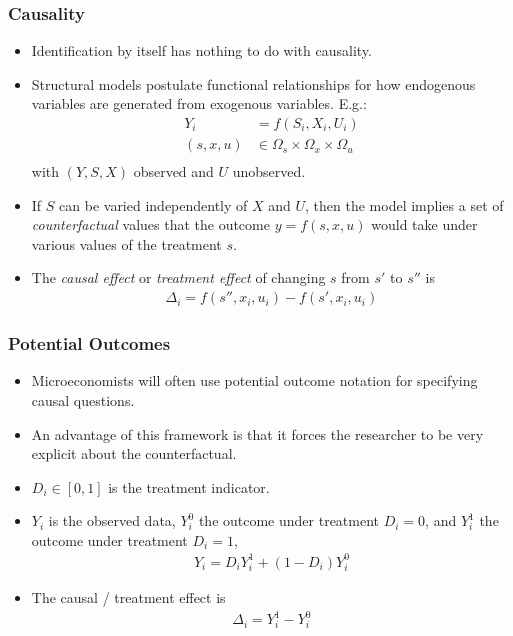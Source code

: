 \documentclass[english,xcolor=svgnames]{beamer}
\begin{document}
\begin{frame}
\frametitle[alignment=center]{Causality}
\begin{itemize}
	\item Identification by itself has nothing to do with causality. 
	\item Structural models postulate functional relationships for how endogenous variables are generated from exogenous variables. E.g.:
	\begin{align*}
		Y_i &= f(S_i,X_i,U_i) \\
		(s,x,u) &\in \Omega_s \times \Omega_x \times \Omega_u \\
	\end{align*}
	with $(Y,S,X)$ observed and $U$ unobserved.
	\item If $S$ can be varied independently of $X$ and $U$, then the model implies a set of \emph{counterfactual} values that the outcome $y=f(s,x,u)$ would take under various values of the treatment $s$.
	\item The \emph{causal effect} or \emph{treatment effect} of changing $s$ from $s'$ to $s''$ is
	\begin{align*}
		\Delta_i = f(s'',x_i,u_i) - f(s',x_i,u_i)
	\end{align*}
\end{itemize}
\end{frame}

\begin{frame}
\frametitle[alignment=center]{Potential Outcomes}
\begin{itemize}
	\item Microeconomists will often use potential outcome notation for specifying causal questions. 
	\item An advantage of this framework is that it forces the researcher to be very explicit about the counterfactual.
	\item $D_i\in[0,1]$ is the treatment indicator.
	\item $Y_i$ is the observed data, $Y_i^0$ the outcome under treatment $D_i=0$, and $Y_i^1$ the outcome under treatment $D_i=1$,
	\begin{align*}
		Y_i = D_i Y_i^1 + (1-D_i) Y_i^0
	\end{align*}
	\item The causal / treatment effect is
	\begin{align*}
		\Delta_i = Y_i^1 - Y_i^0
	\end{align*}
\end{itemize}
\end{frame}
\end{document}
